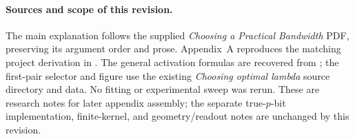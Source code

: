 \documentclass[11pt]{article}
\begin{document}
\paragraph{Sources and scope of this revision.}
The main explanation follows the supplied \emph{Choosing a Practical
Bandwidth} PDF, preserving its argument order and prose. Appendix~A reproduces
the matching project derivation in
.
The general activation formulas are recovered from
; the first-pair selector and figure use the
existing \emph{Choosing optimal lambda} source directory and data. No fitting
or experimental sweep was rerun. These are research notes for later appendix
assembly; the separate true-$p$-bit implementation, finite-kernel, and
geometry/readout notes are unchanged by this revision.
\end{document}
